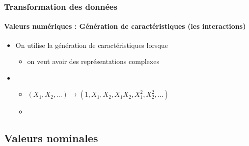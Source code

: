 \documentclass[xcolor=table]{beamer}
\begin{document}
\begin{frame}
	\frametitle{Transformation des données}
	\framesubtitle{Valeurs numériques : Génération de caractéristiques (les interactions)}
	
			
			\begin{itemize}
				\item On utilise la génération de caractéristiques lorsque
				\begin{itemize}
					\item on veut avoir des représentations complexes 
				\end{itemize}
				\item {}
				\begin{itemize}
					\item $(X_1, X_2, \ldots) \longrightarrow (1, X_1, X_2, X_1 X_2, X_1^2, X_2^2, \ldots)$
					\item {}
				\end{itemize}
			\end{itemize}
	
\end{frame}

\subsection{Valeurs nominales}
\end{document}
